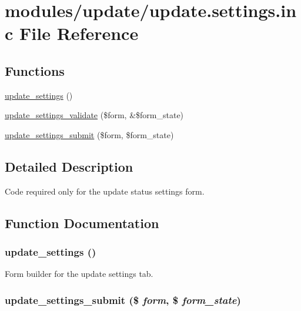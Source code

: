 \hypertarget{update_8settings_8inc}{
\section{modules/update/update.settings.inc File Reference}
\label{update_8settings_8inc}
}
\subsection*{Functions}
\begin{CompactItemize}
\item 
\hyperlink{update_8settings_8inc_5b6d2cc99b743a7896d6411473c1832c}{update\_\-settings} ()
\item 
\hyperlink{update_8settings_8inc_1dc52dbb9606fca692a9fb3f8127da01}{update\_\-settings\_\-validate} (\$form, \&\$form\_\-state)
\item 
\hyperlink{update_8settings_8inc_eed026cbe23eddff17c100d629c4e3bc}{update\_\-settings\_\-submit} (\$form, \$form\_\-state)
\end{CompactItemize}


\subsection{Detailed Description}
Code required only for the update status settings form. 

\subsection{Function Documentation}
\hypertarget{update_8settings_8inc_5b6d2cc99b743a7896d6411473c1832c}{
\subsubsection[{update\_\-settings}]{\setlength{\rightskip}{0pt plus 5cm}update\_\-settings ()}}
\label{update_8settings_8inc_5b6d2cc99b743a7896d6411473c1832c}


Form builder for the update settings tab. \hypertarget{update_8settings_8inc_eed026cbe23eddff17c100d629c4e3bc}{
\subsubsection[{update\_\-settings\_\-submit}]{\setlength{\rightskip}{0pt plus 5cm}update\_\-settings\_\-submit (\$ {\em form}, \/  \$ {\em form\_\-state})}}
\label{update_8settings_8inc_eed026cbe23eddff17c100d629c4e3bc}


